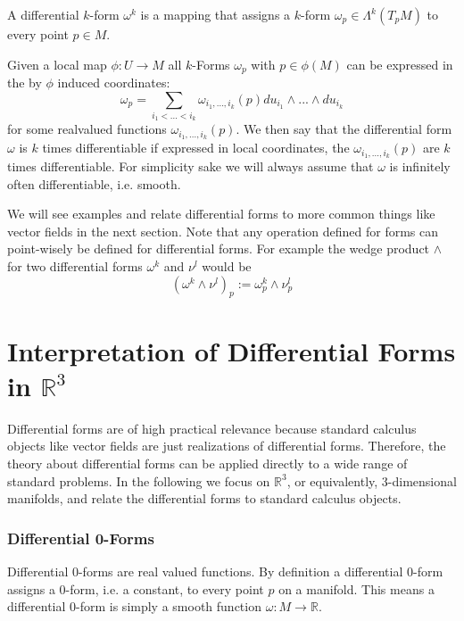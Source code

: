 \begin{definition}
A differential $k$-form $\omega^k$ is a mapping that assigns a $k$-form $\omega_p \in \Lambda^k(T_pM)$ to every point $p\in M$.

Given a local map $\phi: U \rightarrow M$ all $k$-Forms $\omega_p$ with $p\in \phi(M)$ can be expressed in the by $\phi$ induced coordinates:
\[\omega_p = \sum_{i_1<...<i_k}\omega_{i_1,...,i_k}(p) du_{i_1}\wedge...\wedge du_{i_k}\]
for some realvalued functions $\omega_{i_1,...,i_k}(p)$. We then say that the differential form $\omega$ is $k$ times differentiable if expressed in local coordinates, the $\omega_{i_1,...,i_k}(p)$ are $k$ times differentiable. For simplicity sake we will always assume that $\omega$ is infinitely often differentiable, i.e. smooth.

\end{definition}

We will see examples and relate differential forms to more common things like vector fields in the next section. Note that any operation defined for forms can point-wisely be defined for differential forms. For example the wedge product $\wedge$ for two differential forms $\omega^k$ and $\nu^l$ would be
\[(\omega^k\wedge \nu^l)_p := \omega^k_p\wedge \nu^l_p\]


\section{Interpretation of Differential Forms in $\mathbb{R}^3$}
\label{subsec:diffformsare}
Differential forms are of high practical relevance because standard calculus objects like vector fields are just realizations of differential forms. Therefore, the theory about differential forms can be applied directly to a wide range of standard problems. In the following we focus on $\mathbb R^3$, or equivalently, 3-dimensional manifolds, and relate the differential forms to standard calculus objects.

\subsubsection{Differential 0-Forms}
Differential 0-forms are real valued functions. By definition a differential 0-form assigns a 0-form, i.e. a constant, to every point $p$ on a manifold. This means a differential 0-form is simply a smooth function $\omega: M \to \mathbb R$. 

